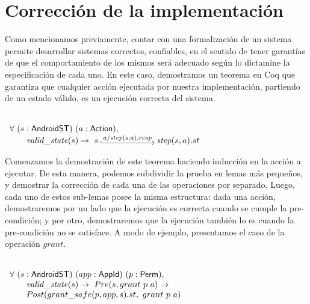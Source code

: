 \section{Corrección de la implementación}
Como mencionamos previamente, contar con una formalización de un sistema permite desarrollar
sistemas correctos, confiables, en el sentido de tener garantías de que el comportamiento de los
mismos será adecuado según lo dictamine la especificación de cada uno. En este caso, demostramos un
teorema en Coq que garantiza que cualquier acción ejecutada por nuestra implementación, partiendo de
un estado válido, es un ejecución correcta del sistema.


\begin{theorem}
     \label{theorem:soundness} \mbox{} \\
    $ \begin{array}[t]{l} \forall\ (s:\AndroidState)\ (a:\Action), \\
            \quad \quad \ap{valid\_state}{s} \rightarrow\ s\step{a/step(s,a).resp}
            \bap{step}{s}{a}.st                             \\
        \end{array} $
\end{theorem}

Comenzamos la demostración de este teorema haciendo inducción en la acción a ejecutar. De esta
manera, podemos subdividir la prueba en lemas más pequeños, y demostrar la corrección de cada una de
las operaciones por separado. Luego, cada uno de estos sub-lemas posee la misma estructura: dada una
acción, demostraremos por un lado que la ejecución es correcta cuando se cumple la pre-condición; y
por otro, demostraremos que la ejecución también lo es cuando la pre-condición no se satisface. A
modo de ejemplo, presentamos el caso de la operación $grant$.

\begin{lemma}
     \mbox{} \\
    $ \begin{array}[t]{l} \forall\ (s:\AndroidState)\ (app:\AppId)\ (p:\Perm),
            \\
            \quad \quad \ap{valid\_state}{s} \rightarrow\ Pre(s, grant\ p\ a) \rightarrow \\
            \quad \quad Post(grant\_safe(p, app, s).st,\ grant\ p\ a)                     \\
        \end{array} $
\end{lemma}

